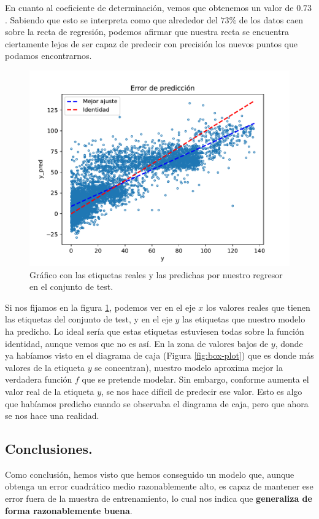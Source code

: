 \documentclass[a4paper, 20pt]{article}
\begin{document}
En cuanto al coeficiente de determinación, vemos que obtenemos un valor de $0.73$. Sabiendo que esto se interpreta como que alrededor del $73\%$ de los datos caen sobre la recta de regresión, podemos afirmar que nuestra recta se encuentra ciertamente lejos de ser capaz de predecir con precisión los nuevos puntos que podamos encontrarnos.

\begin{figure}[H]
  \centering
  \includegraphics[width=0.55\linewidth]{media/residues_error.pdf}
  \caption{Gráfico con las etiquetas reales y las predichas por nuestro regresor en el conjunto de test. }
  \label{fig:noise-reg}
\end{figure}

Si nos fijamos en la figura \ref{fig:noise-reg}, podemos ver en el eje $x$ los valores reales que tienen las etiquetas del conjunto de test, y en el eje $y$ las etiquetas que nuestro modelo ha predicho. Lo ideal sería que estas etiquetas estuviesen todas sobre la función identidad, aunque vemos que no es así. En la zona de valores bajos de $y$, donde ya habíamos visto en el diagrama de caja (Figura \ref{fig:box-plot}) que es donde más valores de la etiqueta $y$ se concentran), nuestro modelo aproxima mejor la verdadera función $f$ que se pretende modelar. Sin embargo, conforme aumenta el valor real de la etiqueta $y$, se nos hace difícil de predecir ese valor. Esto es algo que habíamos predicho cuando se observaba el diagrama de caja, pero que ahora se nos hace una realidad. 

\subsection{Conclusiones.}

Como conclusión, hemos visto que hemos conseguido un modelo que, aunque obtenga un error cuadrático medio razonablemente alto, es capaz de mantener ese error fuera de la muestra de entrenamiento, lo cual nos indica que \textbf{generaliza de forma razonablemente buena}.
\end{document}
